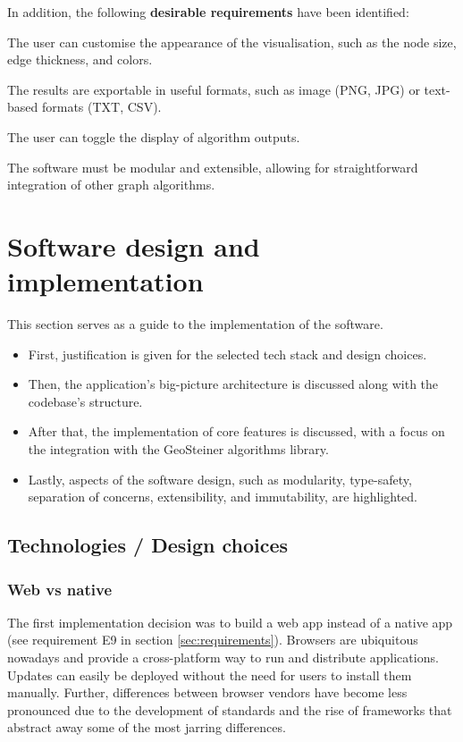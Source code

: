\documentclass{l4proj}
\begin{document}
In addition, the following \textbf{desirable requirements} have been identified:
\begin{desirables}
    \item The user can customise the appearance of the visualisation, such as the node size, edge thickness, and colors.
    \item The results are exportable in useful formats, such as image (PNG, JPG) or text-based formats (TXT, CSV).
    \item The user can toggle the display of algorithm outputs.
    \item The software must be modular and extensible, allowing for straightforward integration of other graph algorithms.
\end{desirables}

\chapter{Software design and implementation}
This section serves as a guide to the implementation of the software.
\begin{itemize}
    \item First, justification is given for the selected tech stack and design choices.
    \item Then, the application's big-picture architecture is discussed along with the codebase's structure.
    \item After that, the implementation of core features is discussed, with a focus on the integration with the GeoSteiner algorithms library.
    \item Lastly, aspects of the software design, such as modularity, type-safety, separation of concerns, extensibility, and immutability, are highlighted.
\end{itemize}

\section{Technologies / Design choices}
\subsection{Web vs native}
The first implementation decision was to build a web app instead of a native app (see requirement E9 in section \ref{sec:requirements}). Browsers are ubiquitous nowadays and provide a cross-platform way to run and distribute applications. Updates can easily be deployed without the need for users to install them manually. Further, differences between browser vendors have become less pronounced due to the development of standards and the rise of frameworks that abstract away some of the most jarring differences.
\end{document}
